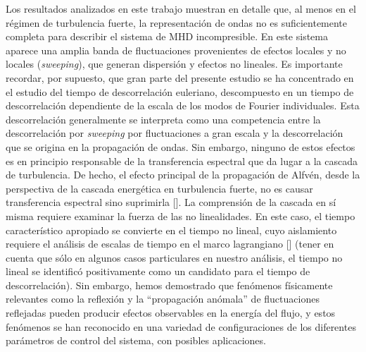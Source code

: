 Los resultados analizados en este trabajo muestran en detalle que, al
menos en el régimen de turbulencia fuerte, la representación de ondas
no es suficientemente completa para describir el sistema de MHD
incompresible. En este sistema aparece una amplia banda de
fluctuaciones provenientes de efectos locales y no locales
(\textit{sweeping}), que generan dispersión y efectos no lineales. Es
importante recordar, por supuesto, que gran parte del presente estudio
se ha concentrado en el estudio del tiempo de descorrelación euleriano,
descompuesto en un tiempo de descorrelación dependiente de la escala de
los modos de Fourier individuales. Esta descorrelación generalmente se
interpreta como una competencia entre la descorrelación por \textit{sweeping}
por fluctuaciones a gran escala y la descorrelación que se origina en
la propagación de ondas. Sin embargo, ninguno de estos efectos es en
principio responsable de la transferencia espectral que da lugar a la
cascada de turbulencia. De hecho, el efecto principal de la
propagación de Alfvén, desde la perspectiva de la cascada energética
en turbulencia fuerte, no es causar transferencia espectral sino
suprimirla [\cite{shebalin_1983_anisotropy}]. La comprensión de la
cascada en sí misma requiere examinar la fuerza de las no
linealidades. En este caso, el tiempo característico apropiado se
convierte en el tiempo no lineal, cuyo aislamiento requiere el
análisis de escalas de tiempo en el marco lagrangiano
[\cite{kraichnan_1964_kolmogorov}] (tener en cuenta que sólo en algunos
casos particulares en nuestro análisis, el tiempo no lineal se
identificó positivamente como un candidato para el tiempo de
descorrelación). Sin embargo, hemos demostrado que fenómenos
físicamente relevantes como la reflexión y la ``propagación anómala''
de fluctuaciones reflejadas pueden producir efectos observables en la
energía del flujo, y estos fenómenos se han reconocido en una variedad
de configuraciones de los diferentes parámetros de control del
sistema, con posibles aplicaciones.

